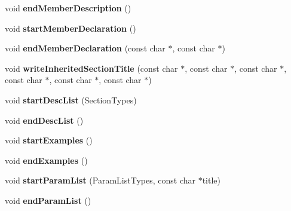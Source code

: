 \begin{DoxyCompactItemize}
\item 
\mbox{\label{class_latex_generator_ac73e2b21e08541913b49077b57772b81}} 
void {\bfseries end\+Member\+Description} ()
\item 
\mbox{\label{class_latex_generator_a960022ab73b0ed3a206ab0213a441ecf}} 
void {\bfseries start\+Member\+Declaration} ()
\item 
\mbox{\label{class_latex_generator_aef5e24c5148ee8bbd44f3714d7245222}} 
void {\bfseries end\+Member\+Declaration} (const char $\ast$, const char $\ast$)
\item 
\mbox{\label{class_latex_generator_ab220991e00f47ee214d913afb0dcde0e}} 
void {\bfseries write\+Inherited\+Section\+Title} (const char $\ast$, const char $\ast$, const char $\ast$, const char $\ast$, const char $\ast$, const char $\ast$)
\item 
\mbox{\label{class_latex_generator_a00a3cac1ee031131ea910dc3c166b99f}} 
void {\bfseries start\+Desc\+List} (Section\+Types)
\item 
\mbox{\label{class_latex_generator_afa2168d8b4b6bb3ec79398128e5a36f6}} 
void {\bfseries end\+Desc\+List} ()
\item 
\mbox{\label{class_latex_generator_af08feb8dca54294eef6b60f1b7154c4b}} 
void {\bfseries start\+Examples} ()
\item 
\mbox{\label{class_latex_generator_a31d82295f3be69fea7e599ab7c337ea4}} 
void {\bfseries end\+Examples} ()
\item 
\mbox{\label{class_latex_generator_a2ee56b14fecf40c894b24bab806fb6b1}} 
void {\bfseries start\+Param\+List} (Param\+List\+Types, const char $\ast$title)
\item 
\mbox{\label{class_latex_generator_ac4add448cd45bd24b9055e59ca16c0e1}} 
void {\bfseries end\+Param\+List} ()
\item 
\mbox{\label{class_latex_generator_a423a4c8f0d6b49352edcfa7261fdb1c0}} 

\end{DoxyCompactItemize}

